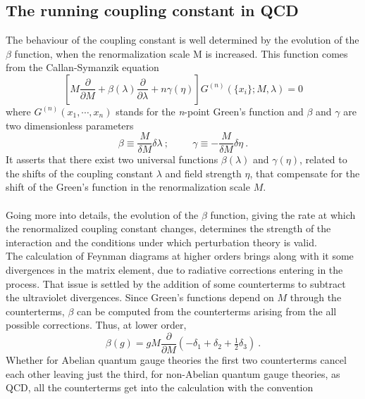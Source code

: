 \subsection{The running coupling constant in QCD}
The behaviour of the coupling constant is well determined by the evolution of the $\beta$ function, when the renormalization scale M is increased. This function comes from the Callan-Symanzik equation\cite{PhysRevD.2.1541, symanzik1970}
\begin{equation}
\left[ M \frac{\partial}{\partial M} + \beta(\lambda)\frac{\partial}{\partial \lambda} + n \gamma(\eta)\right]G^{(n)}(\{x_i\}; M, \lambda) = 0
\end{equation}
where $G^{(n)}(x_1,\cdots, x_n)$ stands for the \emph{n}-point Green's function and $\beta$ and $\gamma$ are two dimensionless parameters
\begin{equation}
\beta \equiv \frac{M}{\delta M}\delta{\lambda}\:; \hspace{1cm} \gamma \equiv - \frac{M}{\delta M}\delta \eta\:.
\end{equation}
It asserts that there exist two universal functions $\beta(\lambda)$ and $\gamma(\eta)$, related to the shifts of the coupling constant $\lambda$ and field strength $\eta$, that compensate for the shift of the Green's function in the renormalization scale $M$.
\\\\
Going more into details, the evolution of the $\beta$ function, giving the rate at which the renormalized coupling constant changes, determines the strength of the interaction and the conditions under which perturbation theory is valid.
\\
The calculation of Feynman diagrams at higher orders brings along with it some divergences in the matrix element, due to radiative corrections entering in the process. That issue is settled by the addition of some counterterms to subtract the ultraviolet divergences. Since Green's functions depend on $M$ through the counterterms, $\beta$ can be computed from the counterterms arising from the all possible corrections. Thus, at lower order,
\begin{equation}
\beta(g) = gM\frac{\partial}{\partial M}(-\delta_1+\delta_2+\tfrac{1}{2}\delta_3)\:.
\label{beta_function}
\end{equation}
Whether for Abelian quantum gauge theories the first two counterterms cancel each other leaving just the third, for non-Abelian quantum gauge theories, as QCD, all the counterterms get into the calculation with the convention
